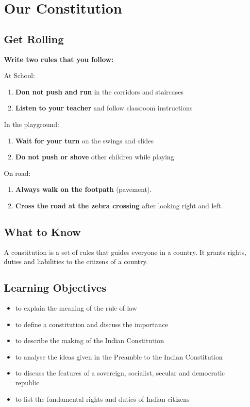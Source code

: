 \chapter{Our Constitution}
\section{Get Rolling}
\textbf{Write two rules that you follow:}
\vspace{0.1in}
\par
At School:
\begin{enumerate}
    \item \textbf{Don not push and run} in the corridors and staircases
    \item \textbf{Listen to your teacher} and follow classroom instructions
\end{enumerate}
In the playground:
\begin{enumerate}
    \item \textbf{Wait for your turn} on the swings and slides
    \item \textbf{Do not push or shove} other children while playing
\end{enumerate}
On road:
\begin{enumerate}
    \item \textbf{Always walk on the footpath} (pavement).
    \item \textbf{Cross the road at the zebra crossing} after looking right and left.
\end{enumerate}
\section{What to Know}
A constitution is a set of rules that guides everyone in a country. It grants rights, duties and liabilities to the citizens of a country.
\section{\textbf{Learning Objectives}}
\begin{itemize}
    \item to explain the meaning of the rule of law
    \item to define a constitution and discuss the importance
    \item to describe the making of the Indian Constitution
    \item to analyse the ideas given in the Preamble to the Indian Constitution
    \item to discuss the features of a sovereign, socialist, secular and democratic republic
    \item to list the fundamental rights and duties of Indian citizens
\end{itemize}
